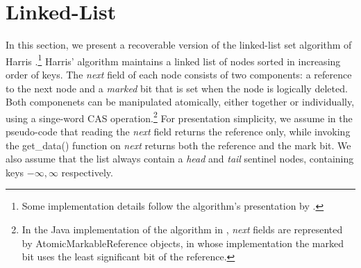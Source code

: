 
\newcommand{\search}{\mbox{\sc Search}}
\newcommand{\recover}{\mbox{\sc Recover}}
\newcommand{\insertlst}{\mbox{\sc Insert}}
\newcommand{\delete}{\mbox{\sc Delete}}
\newcommand{\find}{\mbox{\sc Find}}
\newcommand{\getdata}{\mbox{get\_data()}}


\newcommand{\init}{\mbox{$\bot$}}
\newcommand{\NULL}{\mbox{\sc Null}}
\newcommand{\fail}{\mbox{\sc Fail}}

\newcommand{\Info}{\mbox{Info}}

\newenvironment{routine}[1][htb] {
	\renewcommand{\algorithmcfname}{Routine}%
	\begin{algorithm}[#1]%
	}{\end{algorithm}}




\section{Linked-List}

In this section, we present a recoverable version of the linked-list set algorithm of Harris \cite{DBLP:conf/wdag/Harris01}.\footnote{Some implementation details follow the algorithm's presentation by \cite{Herlihy:2008:AMP:1734069}.} Harris' algorithm maintains a linked list of nodes sorted in increasing order of keys. The \emph{next} field of each node consists of two components: a reference to the next node and a \emph{marked} bit that is set when the node is logically deleted. Both componenets can be manipulated atomically, either together or individually, using a singe-word CAS operation.\footnote{In the Java implementation of the algorithm in \cite{Herlihy:2008:AMP:1734069}, \emph{next} fields are represented by AtomicMarkableReference objects, in whose implementation the marked bit uses the least significant bit of the reference.}
For presentation simplicity, we assume in the pseudo-code that reading the \emph{next} field returns the reference only, while invoking the get\_data() function on \emph{next} returns both the reference and the mark bit. %
We also assume that the list always contain a \emph{head} and \emph{tail} sentinel nodes, containing keys $-\infty, \infty$ respectively. %

